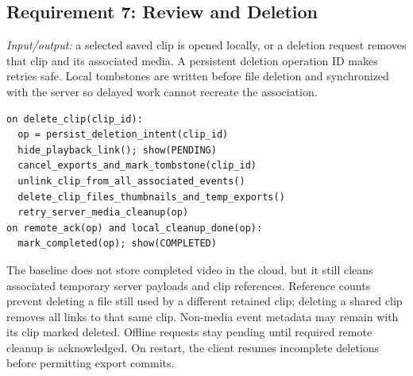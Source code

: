 \subsection{Requirement 7: Review and Deletion}
\textit{Input/output:} a selected saved clip is opened locally, or a deletion request removes that clip and its associated media. A persistent deletion operation ID makes retries safe. Local tombstones are written before file deletion and synchronized with the server so delayed work cannot recreate the association.
\par\smallskip\noindent\begin{minipage}{\columnwidth}
\begin{lstlisting}
on delete_clip(clip_id):
  op = persist_deletion_intent(clip_id)
  hide_playback_link(); show(PENDING)
  cancel_exports_and_mark_tombstone(clip_id)
  unlink_clip_from_all_associated_events()
  delete_clip_files_thumbnails_and_temp_exports()
  retry_server_media_cleanup(op)
on remote_ack(op) and local_cleanup_done(op):
  mark_completed(op); show(COMPLETED)
\end{lstlisting}
\end{minipage}\par
The baseline does not store completed video in the cloud, but it still cleans associated temporary server payloads and clip references. Reference counts prevent deleting a file still used by a different retained clip; deleting a shared clip removes all links to that same clip. Non-media event metadata may remain with its clip marked deleted. Offline requests stay pending until required remote cleanup is acknowledged. On restart, the client resumes incomplete deletions before permitting export commits.

